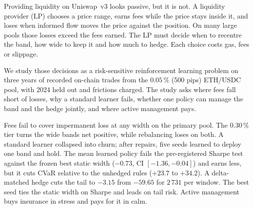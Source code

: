 Providing liquidity on Uniswap~v3 looks passive, but it is not. A liquidity
provider (LP) chooses a price range, earns fees while the price stays inside
it, and loses when informed flow moves the price against the position. On
many large pools those losses exceed the fees earned. The LP must decide
when to recentre the band, how wide to keep it and how much to hedge. Each
choice costs gas, fees or slippage.

We study those decisions as a risk-sensitive reinforcement learning problem
on three years of recorded on-chain trades from the $0.05\,\%$ (500 pips)
ETH/USDC pool, with 2024 held out and frictions charged. The study asks
where fees fall short of losses, why a standard learner fails, whether one
policy can manage the band and the hedge jointly, and where active
management pays.

Fees fail to cover impermanent loss at any width on the primary pool. The
$0.30\,\%$ tier turns the wide bands net positive, while rebalancing loses
on both. A standard learner collapsed into churn; after repairs, five seeds
learned to deploy one band and hold. The mean learned policy fails the
pre-registered Sharpe test against the frozen best static width ($-0.73$,
CI $[-1.36,-0.04]$) and earns less, but it cuts CVaR relative to the
unhedged rules ($+23.7$ to $+34.2$). A delta-matched hedge cuts the tail to
$-3.15$ from $-59.65$ for $2\,731$ per window. The best seed ties the static
width on Sharpe and leads on tail risk. Active management buys insurance in
stress and pays for it in calm.

